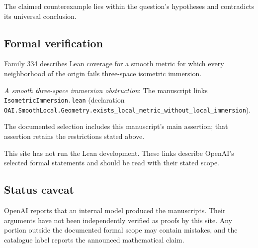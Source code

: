 \documentclass[11pt]{article}
\begin{document}
The claimed counterexample lies within the question’s hypotheses and contradicts its universal conclusion.

\subsection{Formal verification}
Family 334 describes Lean coverage for a smooth metric for which every neighborhood of the origin fails three-space isometric immersion.

\textit{A smooth three-space immersion obstruction}: The manuscript links \texttt{IsometricImmersion.lean} (declaration \texttt{OAI.SmoothLocal.Geometry.exists\_local\_metric\_without\_local\_immersion}).

The documented selection includes this manuscript’s main assertion; that assertion retains the restrictions stated above.

This site has not run the Lean development. These links describe OpenAI’s selected formal statements and should be read with their stated scope.

\subsection{Status caveat}
OpenAI reports that an internal model produced the manuscripts. Their arguments have not been independently verified as proofs by this site. Any portion outside the documented formal scope may contain mistakes, and the catalogue label reports the announced mathematical claim.
\end{document}
